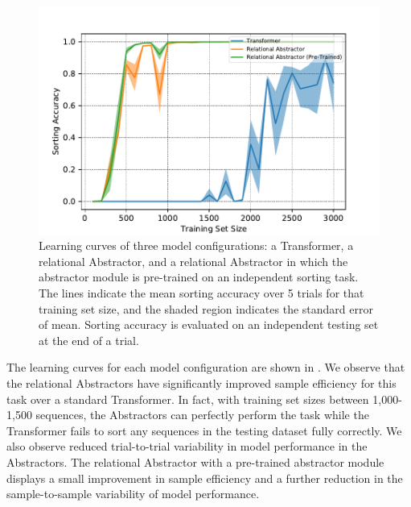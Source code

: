 \begin{figure}[t!]
	\centering
	\includegraphics[width=.8\textwidth]{figures/random_object_argsort_learning_curves.pdf}
	\caption{Learning curves of three model configurations: a Transformer, a relational Abstractor, and a relational Abstractor in which the abstractor module is pre-trained on an independent sorting task. The lines indicate the mean sorting accuracy over 5 trials for that training set size, and the shaded region indicates the standard error of mean. Sorting accuracy is evaluated on an independent testing set at the end of a trial.}
	\label{fig:random_object_argsort_learning_curves}
\end{figure}


The learning curves for each model configuration are shown in . We observe that the relational Abstractors have significantly improved sample efficiency for this task over a standard Transformer. In fact, with training set sizes between 1,000-1,500 sequences, the Abstractors can perfectly perform the task while the Transformer fails to sort any sequences in the testing dataset fully correctly. We also observe reduced trial-to-trial variability in model performance in the Abstractors.
The relational Abstractor with a pre-trained abstractor module displays a small improvement in sample efficiency and a further reduction in the sample-to-sample variability of model performance.

